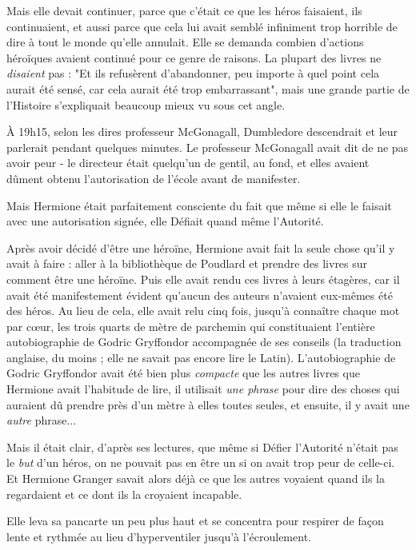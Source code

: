 Mais elle devait continuer, parce que c'était ce que les héros faisaient, ils continuaient, et aussi parce que cela lui avait semblé infiniment trop horrible de dire à tout le monde qu'elle annulait. Elle se demanda combien d'actions héroïques avaient continué pour ce genre de raisons. La plupart des livres ne \emph{disaient}  pas : "Et ils refusèrent d'abandonner, peu importe à quel point cela aurait été sensé, car cela aurait été trop embarrassant", mais une grande partie de l'Histoire s'expliquait beaucoup mieux vu sous cet angle.

À 19h15, selon les dires professeur McGonagall, Dumbledore descendrait et leur parlerait pendant quelques minutes. Le professeur McGonagall avait dit de ne pas avoir peur - le directeur était quelqu'un de gentil, au fond, et elles avaient dûment obtenu l'autorisation de l'école avant de manifester.

Mais Hermione était parfaitement consciente du fait que même si elle le faisait avec une autorisation signée, elle Défiait quand même l'Autorité.

Après avoir décidé d'être une héroïne, Hermione avait fait la seule chose qu'il y avait à faire : aller à la bibliothèque de Poudlard et prendre des livres sur comment être une héroïne. Puis elle avait rendu ces livres à leurs étagères, car il avait été manifestement évident qu'aucun des auteurs n'avaient eux-mêmes été des héros. Au lieu de cela, elle avait relu cinq fois, jusqu'à connaître chaque mot par cœur, les trois quarts de mètre de parchemin qui constituaient l'entière autobiographie de Godric Gryffondor accompagnée de ses conseils (la traduction anglaise, du moins ; elle ne savait pas encore lire le Latin). L'autobiographie de Godric Gryffondor avait été bien plus \emph{compacte}  que les autres livres que Hermione avait l'habitude de lire, il utilisait \emph{une phrase}  pour dire des choses qui auraient dû prendre près d'un mètre à elles toutes seules, et ensuite, il y avait une \emph{autre}  phrase...

Mais il était clair, d'après ses lectures, que même si Défier l'Autorité n'était pas le \emph{but}  d'un héros, on ne pouvait pas en être un si on avait trop peur de celle-ci. Et Hermione Granger savait alors déjà ce que les autres voyaient quand ils la regardaient et ce dont ils la croyaient incapable.

Elle leva sa pancarte un peu plus haut et se concentra pour respirer de façon lente et rythmée au lieu d'hyperventiler jusqu'à l'écroulement.

